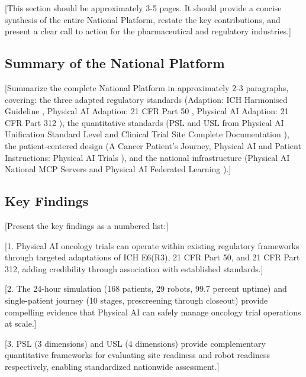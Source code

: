 
[This section should be approximately 3-5 pages. It should provide a concise
synthesis of the entire National Platform, restate the key contributions, and
present a clear call to action for the pharmaceutical and regulatory
industries.]

\subsection{Summary of the National Platform}
\label{subsec:conclusion-summary}

[Summarize the complete National Platform in approximately 2-3 paragraphs,
covering: the three adapted regulatory standards (Adaption: ICH Harmonised
Guideline \cite{ich-adapt}, Physical AI Adaption: 21 CFR Part 50
\cite{cfr50-adapt}, Physical AI Adaption: 21 CFR Part 312 \cite{cfr312-adapt}),
the quantitative standards (PSL and USL from Physical AI Unification Standard
Level \cite{usl-standard} and Clinical Trial Site Complete Documentation
\cite{site-docs}), the patient-centered design (A Cancer Patient's Journey,
Physical AI \cite{patient-journey-paper} and Patient Instructions: Physical AI
Trials \cite{patient-instructions-paper}), and the national infrastructure
(Physical AI National MCP Servers \cite{national-mcp-paper} and Physical AI
Federated Learning \cite{fl-paper}).]

\subsection{Key Findings}
\label{subsec:conclusion-findings}

[Present the key findings as a numbered list:]

[1. Physical AI oncology trials can operate within existing regulatory
frameworks through targeted adaptations of ICH E6(R3), 21 CFR Part 50, and
21 CFR Part 312, adding credibility through association with established
standards.]

[2. The 24-hour simulation (168 patients, 29 robots, 99.7 percent uptime)
and single-patient journey (10 stages, prescreening through closeout)
provide compelling evidence that Physical AI can safely manage oncology
trial operations at scale.]

[3. PSL (3 dimensions) and USL (4 dimensions) provide complementary
quantitative frameworks for evaluating site readiness and robot readiness
respectively, enabling standardized nationwide assessment.]


